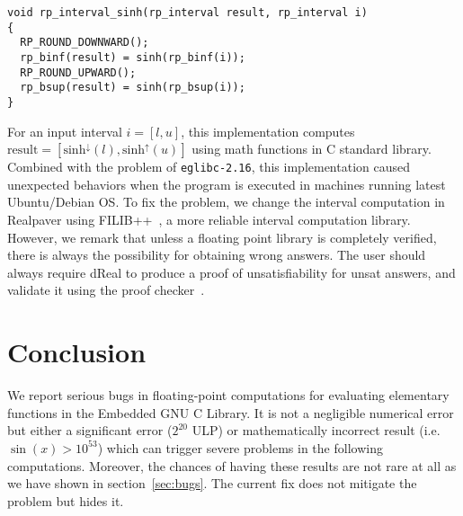 \documentclass{llncs}
\newcommand{\rup}[1]{\ensuremath{\mathrm{#1}^{\uparrow}}}
\newcommand{\rdn}[1]{\ensuremath{\mathrm{#1}^{\downarrow}}}
\begin{document}
\begin{Verbatim}[frame=single, fontsize=\relsize{-1},
  label={\texttt{realpaver-1.0/src/rp\_interval.c}}]
void rp_interval_sinh(rp_interval result, rp_interval i)
{
  RP_ROUND_DOWNWARD();
  rp_binf(result) = sinh(rp_binf(i));
  RP_ROUND_UPWARD();
  rp_bsup(result) = sinh(rp_bsup(i));
}
\end{Verbatim}

For an input interval $i = [l, u]$, this implementation computes
$\mathrm{result} = [\rdn{sinh}(l), \rup{sinh}(u)]$ using math
functions in C standard library. Combined with the problem of
\texttt{eglibc-2.16}, this implementation caused unexpected behaviors
when the program is executed in machines running latest Ubuntu/Debian
OS. To fix the problem, we change the interval computation in
Realpaver using FILIB++~\cite{Lerch:2006:FFI:1141885.1141893}, a more
reliable interval computation library. However, we remark that unless
a floating point library is completely verified, there is always the
possibility for obtaining wrong answers. The user should always
require dReal to produce a proof of unsatisfiability for {\sf unsat}
answers, and validate it using the proof
checker~\cite{DBLP:conf/cade/GaoKC13}.

\section{Conclusion}\label{sec:conclusion}
We report serious bugs in floating-point computations for evaluating
elementary functions in the Embedded GNU C Library. It is not a
negligible numerical error but either a significant error ($2^{20}$
ULP) or mathematically incorrect result (i.e. $\sin(x) > 10^{53}$)
which can trigger severe problems in the following computations.
Moreover, the chances of having these results are not rare at all as
we have shown in section~\ref{sec:bugs}. The current fix does not
mitigate the problem but hides it.



\end{document}
